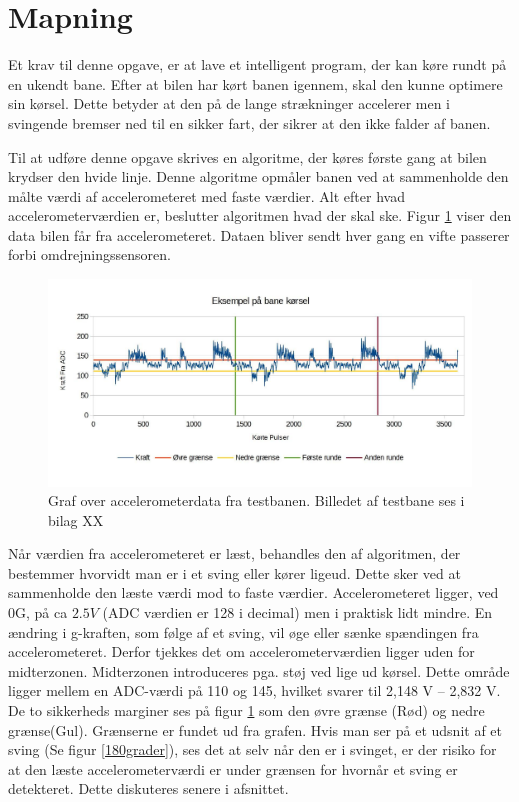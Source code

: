 \section{Mapning}
\label{mapning}
Et krav til denne opgave, er at lave et intelligent program, der kan køre rundt på en ukendt bane. Efter at bilen har kørt banen igennem, skal den kunne optimere sin kørsel. Dette betyder at den på de lange strækninger accelerer men i svingende bremser ned til en sikker fart, der sikrer at den ikke falder af banen.

Til at udføre denne opgave skrives en algoritme, der køres første gang at bilen krydser den hvide linje. Denne algoritme opmåler banen ved at sammenholde den målte værdi af accelerometeret med faste værdier. Alt efter hvad accelerometerværdien er, beslutter algoritmen hvad der skal ske.
Figur \ref{testbanegraf2} viser den data bilen får fra accelerometeret. Dataen bliver sendt hver gang en vifte passerer forbi omdrejningssensoren.\\

\begin{figure}[h!]
\centering
\includegraphics[scale=0.25]{./Graphics/banekorsel}
\caption{Graf over accelerometerdata fra testbanen. Billedet af testbane ses i bilag XX}
\label{testbanegraf2}
\end{figure}

Når værdien fra accelerometeret er læst, behandles den af algoritmen, der bestemmer hvorvidt man er i et sving eller kører ligeud. Dette sker ved at sammenholde den læste værdi mod to faste værdier. Accelerometeret ligger, ved 0G, på ca $2.5 V$ (ADC værdien er 128 i decimal) men i praktisk lidt mindre. En ændring i g-kraften, som følge af et sving, vil øge eller sænke spændingen fra accelerometeret. Derfor tjekkes det om accelerometerværdien ligger uden for midterzonen. Midterzonen introduceres pga. støj ved lige ud kørsel. Dette område ligger mellem en ADC-værdi på 110 og 145, hvilket svarer til 2,148 V – 2,832 V. De to 
sikkerheds marginer ses på figur \ref{testbanegraf2} som den øvre grænse (Rød) og nedre grænse(Gul). Grænserne er fundet ud fra grafen.
Hvis man ser på et udsnit af et sving (Se figur \ref{180grader}), ses det at selv når den er i svinget, er der risiko for at den læste accelerometerværdi er under grænsen for hvornår et sving er detekteret. Dette diskuteres senere i afsnittet.\\

